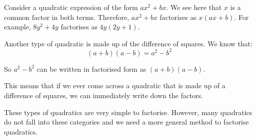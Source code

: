 Consider a quadratic expression of the form $a{x}^{2}+bx$. We see here
that $x$ is a common factor in both terms. Therefore, $a{x}^{2}+bx$
factorises as $x(ax+b)$. For example, $8{y}^{2}+4y$ factorises as
$4y(2y+1)$.

Another type of quadratic is made up of the difference of squares. We
know that:
\begin{equation*}
  (a+b)(a-b)={a}^{2}-{b}^{2}
\end{equation*}

So $a^2-b^2$ can be written in factorised form as $(a+b)(a-b)$.


This means that if we ever come across a quadratic that is made up of a difference of squares, we can immediately write down the factors. 


These types of quadratics are very simple to factorise. However, many quadratics do not fall into these categories and we need a more general method to factorise quadratics.

